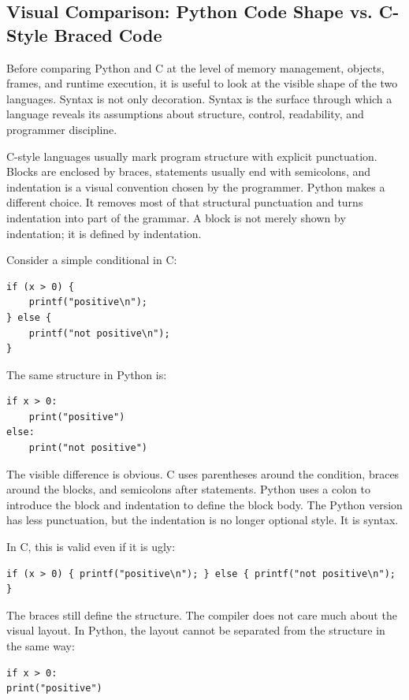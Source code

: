 \subsection{Visual Comparison: Python Code Shape vs. C-Style Braced Code}

Before comparing Python and C at the level of memory management, objects, frames, and runtime execution, it is useful to look at the visible shape of the two languages. Syntax is not only decoration. Syntax is the surface through which a language reveals its assumptions about structure, control, readability, and programmer discipline.

C-style languages usually mark program structure with explicit punctuation. Blocks are enclosed by braces, statements usually end with semicolons, and indentation is a visual convention chosen by the programmer. Python makes a different choice. It removes most of that structural punctuation and turns indentation into part of the grammar. A block is not merely shown by indentation; it is defined by indentation.

Consider a simple conditional in C:

\begin{verbatim}
if (x > 0) {
    printf("positive\n");
} else {
    printf("not positive\n");
}
\end{verbatim}

The same structure in Python is:

\begin{verbatim}
if x > 0:
    print("positive")
else:
    print("not positive")
\end{verbatim}

The visible difference is obvious. C uses parentheses around the condition, braces around the blocks, and semicolons after statements. Python uses a colon to introduce the block and indentation to define the block body. The Python version has less punctuation, but the indentation is no longer optional style. It is syntax.

In C, this is valid even if it is ugly:

\begin{verbatim}
if (x > 0) { printf("positive\n"); } else { printf("not positive\n"); }
\end{verbatim}

The braces still define the structure. The compiler does not care much about the visual layout. In Python, the layout cannot be separated from the structure in the same way:

\begin{verbatim}
if x > 0:
print("positive")
\end{verbatim}

